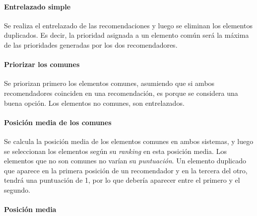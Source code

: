\paragraph*{Entrelazado simple}

Se realiza el entrelazado de las recomendaciones y luego se eliminan los elementos duplicados. Es decir, la prioridad asignada a un elemento común será la máxima de las prioridades generadas por los dos recomendadores.

\paragraph*{Priorizar los comunes}

Se priorizan primero los elementos comunes, asumiendo que si ambos recomendadores coinciden en una recomendación, es porque se considera una buena opción. Los elementos no comunes, son entrelazados.

\paragraph*{Posición media de los comunes}

Se calcula la posición media de los elementos comunes en ambos sistemas, y luego se seleccionan los elementos según su \textit{ranking} en esta posición media. Los elementos que no son comunes no varían su \textit{puntuación}. Un elemento duplicado que aparece en la primera posición de un recomendador y en la tercera del otro, tendrá una puntuación de 1, por lo que debería aparecer entre el primero y el segundo.

\paragraph*{Posición media}


